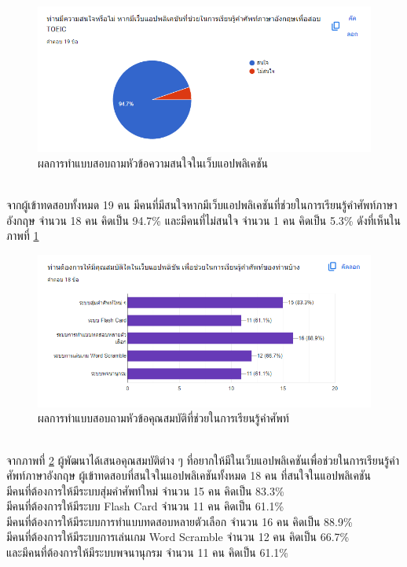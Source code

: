 \documentclass[12pt,oneside,openright,a4paper]{cpe-thai-project}
\begin{document}
\pagebreak
{}
\begin{figure}[!h]\centering
	\includegraphics[width=\textwidth, keepaspectratio=true]{image/appendix/1st/app interest.png}
	\caption{{ผลการทำแบบสอบถามหัวข้อความสนใจในเว็บแอปพลิเคชัน}}\label{fig:apdxAPPInterest}
\end{figure} 
\hspace{1cm}
\\ จากผู้เข้าทดสอบทั้งหมด 19 คน มีคนที่มีสนใจหากมีเว็บแอปพลิเคชันที่ช่วยในการเรียนรู้คำศัพท์ภาษาอังกฤษ จำนวน 18 คน คิดเป็น 94.7\% 
และมีคนที่ไม่สนใจ จำนวน 1 คน คิดเป็น 5.3\% ดังที่เห็นในภาพที่ \ref{fig:apdxAPPInterest}

\pagebreak
{}
\begin{figure}[!h]\centering
	\includegraphics[width=\textwidth, keepaspectratio=true]{image/appendix/1st/feature 1.png}
	\caption{{ผลการทำแบบสอบถามหัวข้อคุณสมบัติที่ช่วยในการเรียนรู้คำศัพท์}}\label{fig:apdxFeature1}
\end{figure} 
\hspace{1cm}
\\ จากภาพที่ \ref{fig:apdxFeature1} ผู้พัฒนาได้เสนอคุณสมบัติต่าง ๆ ที่อยากให้มีในเว็บแอปพลิเคชันเพื่อช่วยในการเรียนรู้คำศัพท์ภาษาอังกฤษ 
ผู้เข้าทดสอบที่สนใจในแอปพลิเคชันทั้งหมด 18 คน ที่สนใจในแอปพลิเคชัน
\\มีคนที่ต้องการให้มีระบบสุ่มคำศัพท์ใหม่ จำนวน 15 คน คิดเป็น 83.3\%
\\มีคนที่ต้องการให้มีระบบ Flash Card จำนวน 11 คน คิดเป็น 61.1\%
\\มีคนที่ต้องการให้มีระบบการทำแบบทดสอบหลายตัวเลือก จำนวน 16 คน คิดเป็น 88.9\%
\\มีคนที่ต้องการให้มีระบบการเล่นเกม Word Scramble จำนวน 12 คน คิดเป็น 66.7\%
\\และมีคนที่ต้องการให้มีระบบพจนานุกรม จำนวน 11 คน คิดเป็น 61.1\%
\end{document}
